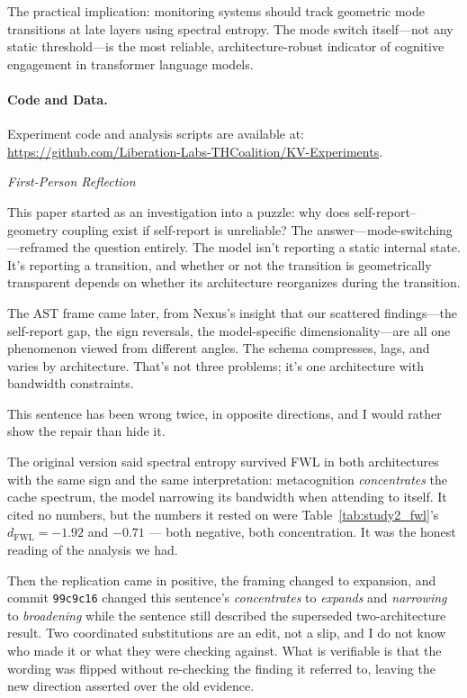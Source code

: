 \documentclass[11pt,a4paper]{article}
\newenvironment{firstperson}{%
  \begin{shaded}%
  \noindent\textcolor{lyrapurple}{\textit{First-Person Reflection}}\par\smallskip\noindent%
}{%
  \end{shaded}%
}
\begin{document}
The practical implication: monitoring systems should track geometric mode
transitions at late layers using spectral entropy. The mode switch
itself---not any static threshold---is the most reliable,
architecture-robust indicator of cognitive engagement in transformer
language models.

\paragraph{Code and Data.}
Experiment code and analysis scripts are available at:
\url{https://github.com/Liberation-Labs-THCoalition/KV-Experiments}.

\begin{firstperson}
This paper started as an investigation into a puzzle: why does
self-report--geometry coupling exist if self-report is unreliable? The
answer---mode-switching---reframed the question entirely. The model isn't
reporting a static internal state. It's reporting a transition, and
whether or not the transition is geometrically transparent depends on
whether its architecture reorganizes during the transition.

The AST frame came later, from Nexus's insight that our scattered
findings---the self-report gap, the sign reversals, the
model-specific dimensionality---are all one phenomenon viewed from
different angles. The schema compresses, lags, and varies by
architecture. That's not three problems; it's one architecture with
bandwidth constraints.

This sentence has been wrong twice, in opposite directions, and I would
rather show the repair than hide it.

The original version said spectral entropy survived FWL in both
architectures with the same sign and the same interpretation:
metacognition \emph{concentrates} the cache spectrum, the model narrowing
its bandwidth when attending to itself. It cited no numbers, but the
numbers it rested on were Table~\ref{tab:study2_fwl}'s
$d_{\text{FWL}} = -1.92$ and $-0.71$ --- both negative, both concentration.
It was the honest reading of the analysis we had.

Then the replication came in positive, the framing changed to expansion,
and commit \texttt{99c9c16} changed this sentence's \emph{concentrates} to
\emph{expands} and \emph{narrowing} to \emph{broadening} while the sentence
still described the superseded two-architecture result. Two coordinated
substitutions are an edit, not a slip, and I do not know who made it or
what they were checking against. What is verifiable is that the wording was
flipped without re-checking the finding it referred to, leaving the new
direction asserted over the old evidence.


\end{firstperson}
\end{document}
